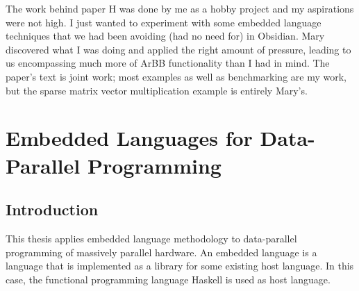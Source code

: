 \documentclass[a4paper]{book}
\newcommand{\thesistitle}{Embedded Languages for Data-Parallel Programming}
\begin{document}
The work behind paper H was done by me as a hobby project and my aspirations were not 
high. I just wanted to experiment with some embedded language techniques that we had 
been avoiding (had no need for) in Obsidian. Mary discovered what I was doing and applied 
the right amount of pressure, leading to us encompassing much more of ArBB functionality than 
I had in mind. The paper's text is joint work; most examples as well as benchmarking are my work,
but the sparse matrix vector multiplication example is entirely Mary's. 



\tableofcontents


\cleardoublepage
\clearpage

\pagestyle{fancy}
\fancyfoot{}
\fancyhead[LO]{}
\fancyhead[RO]{\leftmark}
\renewcommand{\headrulewidth}{0.0pt}
\fancyhead[LE,RO]{\thepage}

%
%
\chapter{\thesistitle}


\section{Introduction} 

This thesis applies embedded language methodology to data-parallel programming of 
massively parallel hardware. An embedded language is a language that is implemented 
as a library for some existing host language. In this case, the functional programming 
language Haskell is used as host language. 
\end{document}
